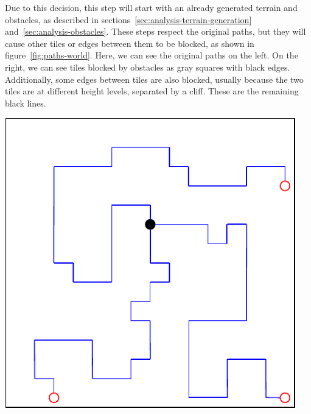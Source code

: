 Due to this decision, this step will start with an already generated terrain and obstacles, as described in sections~\ref{sec:analysis-terrain-generation} and~\ref{sec:analysis-obstacles}.
These steps respect the original paths, but they will cause other tiles or edges between them to be blocked, as shown in figure~\ref{fig:paths-world}.
Here, we can see the original paths on the left.
On the right, we can see tiles blocked by obstacles as gray squares with black edges.
Additionally, some edges between tiles are also blocked, usually because the two tiles are at different height levels, separated by a cliff.
These are the remaining black lines.

\begin{center}
    \captionsetup{type=figure}
    \begin{minipage}{.5\textwidth}
        \centering
        \includegraphics[width=0.95\textwidth]{img/Generated Paths.pdf}
    \end{minipage}%
    \begin{minipage}{.5\textwidth}
        \centering

\end{minipage}
\end{center}
